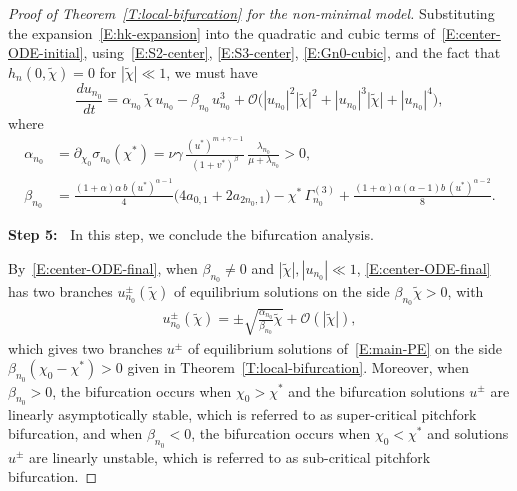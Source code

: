 \documentclass[11pt]{article} %
\theoremstyle{remark}
\theoremstyle{remark}
\numberwithin{equation}{section}
\numberwithin{figure}{section}
\numberwithin{table}{section}
\begin{document}
\begin{proof}[Proof of Theorem~\ref{T:local-bifurcation}  for the non-minimal model]
  Substituting the expansion~\eqref{E:hk-expansion} into the quadratic and cubic
  terms of~\eqref{E:center-ODE-initial}, using~\eqref{E:S2-center},
  \eqref{E:S3-center}, \eqref{E:Gn0-cubic}, and the fact that
  $h_{n}(0,\tilde{\chi}) = 0$ for $|\tilde{\chi}|\ll 1$, we must have
  \begin{equation}\label{E:center-ODE-final}
    \frac{d u_{n_0}}{dt}
    = \alpha_{n_0}\,\tilde{\chi}\,u_{n_0}
    - \beta_{n_0}\,u_{n_0}^3
    + { \mathcal{O}\Big( |u_{n_0}|^{{2}} |\tilde{\chi}|^2+ {|u_{n_0}|^3}
    |\tilde{\chi}|+ |u_{n_0}|^4\Big),}
  \end{equation}
  where
  \begin{align}\label{E:alpha_n0}
    \alpha_{n_0}  & = \partial_{\chi_0}\sigma_{n_0}(\chi^*)
    = \nu\gamma\,\frac{(u^*)^{m+\gamma-1}}{(1+v^*)^\beta}\,
    \frac{\lambda_{n_0}}{\mu+\lambda_{n_0}}
    > 0, \\
    \beta_{n_0}
    & = \frac{(1+\alpha)\alpha\,b\,(u^*)^{\alpha-1}}{4}
    \bigl(4a_{0,1} + 2a_{2n_0,1}\bigr)
    - \chi^*\,\Gamma_{n_0}^{(3)}
    + \frac{(1+\alpha)\alpha(\alpha-1)b\,(u^*)^{\alpha-2}}{8}.
    \label{E:beta-n0}
  \end{align}


  \noindent\textbf{Step 5:~} In this step, we conclude the bifurcation analysis.

  \smallskip

  By~\eqref{E:center-ODE-final}, when $\beta_{n_0} \ne
  0$ and $|\tilde\chi|, |u_{n_0}|\ll 1$, \eqref{E:center-ODE-final} has two branches $u_{n_0}^\pm(\tilde{\chi})$ of
  equilibrium solutions on the side $\beta_{n_0}\widetilde{\chi} > 0$, with
  \begin{align}\label{E:two-branches}
    u_{n_0}^\pm(\widetilde{\chi})
    =\pm\sqrt{\frac{\alpha_{n_0}}{\beta_{n_0}}
    \widetilde{\chi}}+\mathcal{O}(|\widetilde{\chi}|),
  \end{align}
  which gives two branches $u^\pm$ of equilibrium solutions of~\eqref{E:main-PE}
  on the side $\beta_{n_0} (\chi_0 - \chi^*) > 0$ given in
  Theorem~\ref{T:local-bifurcation}. Moreover,
  when $\beta_{n_0} > 0$, the bifurcation occurs when $\chi_0 > \chi^*$ and the
  bifurcation solutions $u^\pm$ are linearly asymptotically stable, which is
  referred to as super-critical pitchfork bifurcation, and when $\beta_{n_0} <
  0$, the bifurcation occurs when $\chi_0 < \chi^*$ and solutions $u^\pm$ are
  linearly unstable, which is referred to as sub-critical pitchfork bifurcation.
\end{proof}
\end{document}
